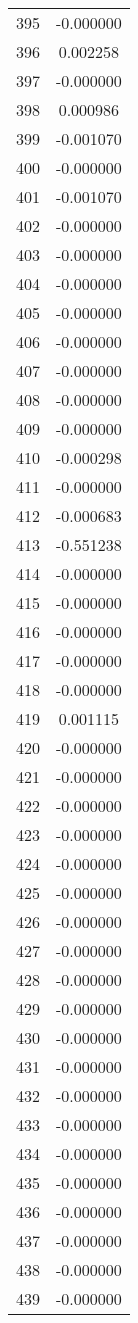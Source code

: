 \documentclass[12pt]{article}
\begin{document}
\begin{longtable}{@{}cc@{}}
395 & -0.000000 \\
396 & 0.002258 \\
397 & -0.000000 \\
398 & 0.000986 \\
399 & -0.001070 \\
400 & -0.000000 \\
401 & -0.001070 \\
402 & -0.000000 \\
403 & -0.000000 \\
404 & -0.000000 \\
405 & -0.000000 \\
406 & -0.000000 \\
407 & -0.000000 \\
408 & -0.000000 \\
409 & -0.000000 \\
410 & -0.000298 \\
411 & -0.000000 \\
412 & -0.000683 \\
413 & -0.551238 \\
414 & -0.000000 \\
415 & -0.000000 \\
416 & -0.000000 \\
417 & -0.000000 \\
418 & -0.000000 \\
419 & 0.001115 \\
420 & -0.000000 \\
421 & -0.000000 \\
422 & -0.000000 \\
423 & -0.000000 \\
424 & -0.000000 \\
425 & -0.000000 \\
426 & -0.000000 \\
427 & -0.000000 \\
428 & -0.000000 \\
429 & -0.000000 \\
430 & -0.000000 \\
431 & -0.000000 \\
432 & -0.000000 \\
433 & -0.000000 \\
434 & -0.000000 \\
435 & -0.000000 \\
436 & -0.000000 \\
437 & -0.000000 \\
438 & -0.000000 \\
439 & -0.000000 \\

\end{longtable}
\end{document}
